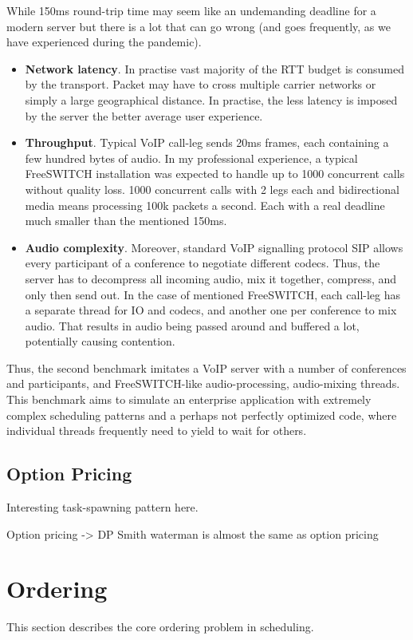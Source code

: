 \documentclass[12pt,a4paper,twoside]{report}
\begin{document}
While 150ms round-trip time may seem like an undemanding deadline for a modern server but there is a lot that can go wrong (and goes frequently, as we have experienced during the pandemic). 
\begin{itemize}
    \item \textbf{Network latency}. In practise vast majority of the RTT budget is consumed by the transport. Packet may have to cross multiple carrier networks or simply a large geographical distance. In practise, the less latency is imposed by the server the better average user experience. 
    \item \textbf{Throughput}. Typical VoIP call-leg sends 20ms frames, each containing a few hundred bytes of audio. In my professional experience, a typical FreeSWITCH \cite{Maruzzelli2017-ou} installation was expected to handle up to 1000 concurrent calls without quality loss. 1000 concurrent calls with 2 legs each and bidirectional media means processing 100k packets a second. Each with a real deadline much smaller than the mentioned 150ms. 
    \item \textbf{Audio complexity}. Moreover, standard VoIP signalling protocol SIP allows every participant of a conference to negotiate different codecs. Thus, the server has to decompress all incoming audio, mix it together, compress, and only then send out. In the case of mentioned FreeSWITCH, each call-leg has a separate thread for IO and codecs, and another one per conference to mix audio. That results in audio being passed around and buffered a lot, potentially causing contention.   
\end{itemize}

Thus, the second benchmark imitates a VoIP server with a number of conferences and participants, and FreeSWITCH-like audio-processing, audio-mixing threads. This benchmark aims to simulate an enterprise application with extremely complex scheduling patterns and a perhaps not perfectly optimized code, where individual threads frequently need to yield to wait for others.

\subsection{Option Pricing}
\label{section:bench-option-pricing}

Interesting task-spawning pattern here.

Option pricing -> DP
Smith waterman is almost the same as option pricing  

\section{Ordering}
\label{section:approaches}
This section describes the core ordering problem in scheduling.
\end{document}
